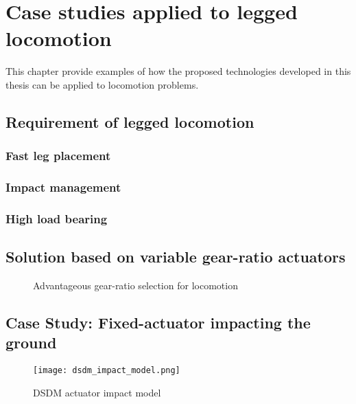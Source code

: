\chapter{Case studies applied to legged locomotion}
\label{sec:casestudy}

This chapter provide examples of how the proposed technologies developed in this thesis can be applied to locomotion problems.

\section{Requirement of legged locomotion}
\label{sec:case_req}

\subsection{Fast leg placement}
\label{sec:fast}

\subsection{Impact management}
\label{sec:impact}

\subsection{High load bearing}
\label{sec:load}


\section{Solution based on variable gear-ratio actuators}
\label{sec:case_sol}

\begin{figure}[H]
        \centering
        \caption{Advantageous gear-ratio selection for locomotion}\label{fig:legsol}
\end{figure}

\section{Case Study: Fixed-actuator impacting the ground}

\begin{figure}[H]
	\centering
		\texttt{[image: dsdm\_impact\_model.png]}
	\caption{DSDM actuator impact model}
	\label{fig:dsdm_impact_model_1}
\end{figure}


